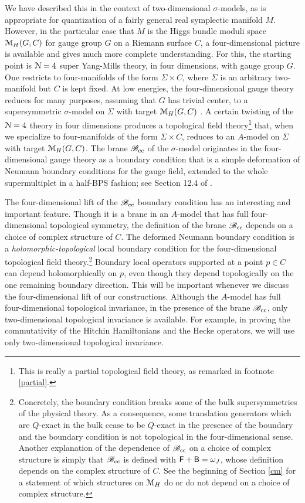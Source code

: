 \documentclass[11pt,a4paper]{article}
\begin{document}
We have described this in the context of two-dimensional $\sigma$-models, as is appropriate for quantization of a fairly general real symplectic manifold $M$.
However, in the particular case that $M$ is the Higgs bundle moduli space ${\mathcal M}_H(G,C)$ for gauge group $G$ on a Riemann surface  $C$, a four-dimensional
picture is available and gives much more complete understanding.   For this, the starting point is ${\mathcal N}=4$ super Yang-Mills theory, in four dimensions,
with gauge group $G$.  One restricts to four-manifolds of the form $\Sigma\times C$, where $\Sigma$ is an arbitrary two-manifold
but $C$ is kept fixed.   At low energies, the four-dimensional gauge theory reduces for many purposes, assuming that $G$ has trivial center,
to a supersymmetric $\sigma$-model on $\Sigma$ with target  ${\mathcal M}_H(G,C)$
\cite{BJSV,JWS}.   A certain twisting of the ${\mathcal N}=4$ theory in four dimensions produces a topological field 
theory\footnote{This is really a partial topological field theory, as remarked in footnote \ref{partial}.}  that, when we specialize
to four-manifolds of the form $\Sigma\times C$, reduces to an $A$-model on $\Sigma$ with target ${\mathcal M}_H(G,C)$.   The brane ${\mathscr B}_{\mathrm{cc}}$ of the $\sigma$-model
originates in the four-dimensional gauge theory as a boundary condition that is a simple deformation of Neumann boundary 
conditions for the gauge field, extended to the whole supermultiplet in a half-BPS fashion; see Section 12.4 of \cite{KW}. 

The four-dimensional lift of the ${\mathscr B}_{\mathrm{cc}}$ boundary condition  has an interesting and important feature.    Though it is a brane in an $A$-model that
has full four-dimensional topological symmetry, the definition of the brane ${\mathscr B}_{\mathrm{cc}}$ depends on a choice of complex structure of $C$.
The deformed Neumann boundary condition is a {\it holomorphic-topological} local boundary condition for the four-dimensional 
topological field theory.\footnote{Concretely, the boundary condition breaks some of the bulk supersymmetries 
of the physical theory. As a consequence, some translation generators which are $Q$-exact in the bulk cease to be $Q$-exact in 
the presence of the boundary and the boundary condition is not topological in the four-dimensional sense.  Another explanation of the dependence of ${\mathscr B}_{\mathrm{cc}}$
on a choice of complex structure is simply that ${\mathscr B}_{\mathrm{cc}}$ 
is defined with ${\sf F}+{\sf B}=\omega_J$, whose definition depends on the complex structure of $C$.   See the beginning of Section \ref{cm} for a statement of which
structures on ${\mathcal M}_H$ do or do not depend on a choice of complex structure. } 
Boundary local operators  supported
at a point $p\in C$ can depend holomorphically  on $p$, even though they depend topologically on the one remaining boundary 
direction. This  will be important whenever we 
discuss the four-dimensional lift of our constructions.  Although the $A$-model has full four-dimensional topological invariance, in the presence of the brane
${\mathscr B}_{\mathrm{cc}}$, only two-dimensional topological invariance is available.   For example, in proving the commutativity of the Hitchin Hamiltonians and the Hecke
operators, we will use only two-dimensional topological invariance.
\end{document}
